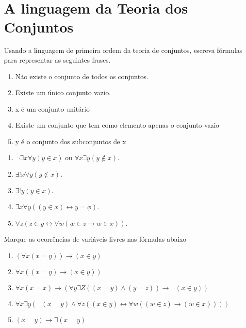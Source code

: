 \chapter{A linguagem da Teoria dos Conjuntos}

\setcounter{ex}{0}

\begin{exercicio}
	Usando a linguagem de primeira ordem da teoria de conjuntos, escreva fórmulas para representar as seguintes frases.
	\begin{enumerate}[label=(\alph{*})]
		\item Não existe o conjunto de todos os conjuntos.
		\item Existe um único conjunto vazio.
		\item x é um conjunto unitário
		\item Existe um conjunto que tem como elemento apenas o conjunto vazio
		\item y é o conjunto dos subconjuntos de x 
	\end{enumerate}
\end{exercicio}

\begin{solucao}
	\begin{enumerate}[label=(\alph{*})]
		\item $\neg \exists x \forall y (y \in x)$ ou $\forall x \exists y (y \notin x)$.
		\item $\exists ! x \forall y (y \notin x)$.
		\item $\exists ! y (y \in x)$.
		\item $\exists x \forall y ((y \in x) \leftrightarrow y = \phi)$.
		\item $\forall z (z \in y \leftrightarrow \forall w (w \in z \to w \in x))$.
	\end{enumerate}
\end{solucao}

\begin{exercicio}
	Marque as ocorrências de variáveis livres nas fórmulas abaixo
\end{exercicio}
\begin{enumerate}[label=(\alph{*})]
	\item $(\forall x (x=y)) \rightarrow (x \in y ) $
	\item $ \forall x ((x=y) \rightarrow (x \in y))$
	\item $\forall x(x=x) \rightarrow (\forall y \exists Z ((x=y) \land (y=z)) \rightarrow \neg(x\in y))$
	\item $ \forall x \exists y(\neg(x=y) \land \forall z ((x \in y) \leftrightarrow \forall w ((w \in z ) \rightarrow (w \in x )))) $
	\item $(x=y)\rightarrow \exists (x=y) $
\end{enumerate}

